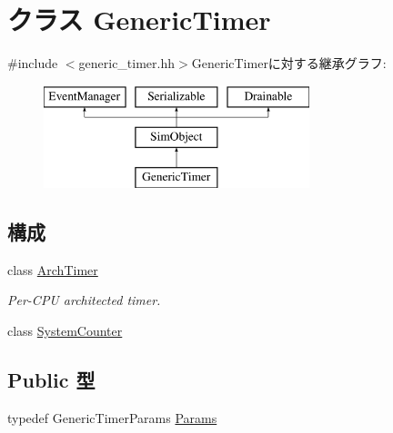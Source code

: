 \hypertarget{classGenericTimer}{
\section{クラス GenericTimer}
\label{classGenericTimer}
}


{\ttfamily \#include $<$generic\_\-timer.hh$>$}GenericTimerに対する継承グラフ:\begin{figure}[H]
\begin{center}
\leavevmode
\includegraphics[height=3cm]{classGenericTimer}
\end{center}
\end{figure}
\subsection*{構成}
\begin{DoxyCompactItemize}
\item 
class \hyperlink{classGenericTimer_1_1ArchTimer}{ArchTimer}
\begin{DoxyCompactList}\small\item\em Per-\/CPU architected timer. \item\end{DoxyCompactList}\item 
class \hyperlink{classGenericTimer_1_1SystemCounter}{SystemCounter}
\end{DoxyCompactItemize}
\subsection*{Public 型}
\begin{DoxyCompactItemize}
\item 
typedef GenericTimerParams \hyperlink{classGenericTimer_a22b88e736eb537a678104e1f9d03b967}{Params}
\end{DoxyCompactItemize}
